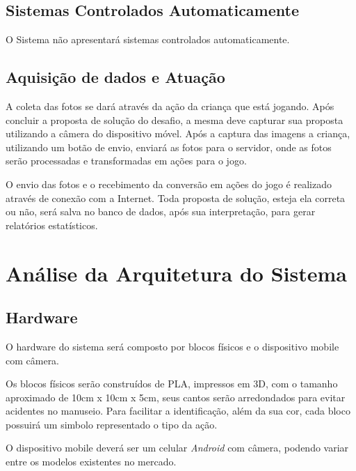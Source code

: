     
    \subsection{Sistemas Controlados Automaticamente}
    O Sistema não apresentará sistemas controlados automaticamente.
    
    \subsection{Aquisição de dados e Atuação}
    A coleta das fotos se dará através da ação da criança que está jogando. Após concluir a proposta de solução do desafio, a mesma deve capturar sua proposta utilizando a câmera do dispositivo móvel.
    Após a captura das imagens a criança, utilizando um botão de envio, enviará as fotos para o servidor, onde as fotos serão processadas e transformadas em ações para o jogo.
    
    O envio das fotos e o recebimento da conversão em ações do jogo é realizado através de conexão com a Internet.
    Toda proposta de solução, esteja ela correta ou não, será salva no banco de dados, após sua interpretação, para gerar relatórios estatísticos.


\section{Análise da Arquitetura do Sistema}

    \subsection{Hardware}
    O hardware do sistema será composto por blocos físicos e o dispositivo mobile com câmera.
    
    Os blocos físicos serão construídos de PLA, impressos em 3D, com o tamanho aproximado de 10cm x 10cm x 5cm, seus cantos serão arredondados para evitar acidentes no manuseio. Para facilitar a identificação, além da sua cor, cada bloco possuirá um simbolo representado o tipo da ação.
    
    O dispositivo mobile deverá ser um celular \textit{Android} com câmera, podendo variar entre os modelos existentes no mercado.
    

